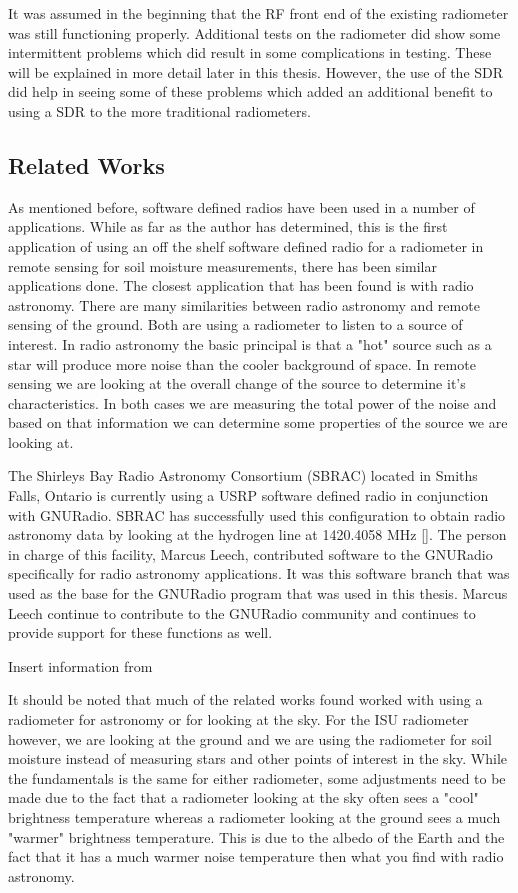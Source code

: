 It was assumed in the beginning that the RF front end of the existing radiometer was still functioning properly.  Additional tests on the radiometer did show some intermittent problems which did result in some complications in testing.  These will be explained in more detail later in this thesis.  However, the use of the SDR did help in seeing some of these problems which added an additional benefit to using a SDR to the more traditional radiometers.  

\subsection{Related Works}
As mentioned before, software defined radios have been used in a number of applications.  While as far as the author has determined, this is the first application of using an off the shelf software defined radio for a radiometer in remote sensing for soil moisture measurements, there has been similar applications done.  The closest application that has been found is with radio astronomy.  There are many similarities between radio astronomy and remote sensing of the ground.  Both are using a radiometer to listen to a source of interest.  In radio astronomy the basic principal is that a "hot" source such as a star will produce more noise than the cooler background of space.  In remote sensing we are looking at the overall change of the source to determine it's characteristics.  In both cases we are measuring the total power of the noise and based on that information we can determine some properties of the source we are looking at.

The Shirleys Bay Radio Astronomy Consortium (SBRAC) located in Smiths Falls, Ontario is currently using a USRP software defined radio in conjunction with GNURadio.  SBRAC has successfully used this configuration to obtain radio astronomy data by looking at the hydrogen line at 1420.4058 MHz [\cite{Leech2007}].  The person in charge of this facility, Marcus Leech, contributed software to the GNURadio specifically for radio astronomy applications.  It was this software branch that was used as the base for the GNURadio program that was used in this thesis.  Marcus Leech continue to contribute to the GNURadio community and continues to provide support for these functions as well.

Insert information from \cite{Behnke}

It should be noted that much of the related works found worked with using a radiometer for astronomy or for looking at the sky.  For the ISU radiometer however, we are looking at the ground and we are using the radiometer for soil moisture instead of measuring stars and other points of interest in the sky.  While the fundamentals is the same for either radiometer, some adjustments need to be made due to the fact that a radiometer looking at the sky often sees a "cool" brightness temperature whereas a radiometer looking at the ground sees a much "warmer" brightness temperature.  This is due to the albedo of the Earth and the fact that it has a much warmer noise temperature then what you find with radio astronomy.

